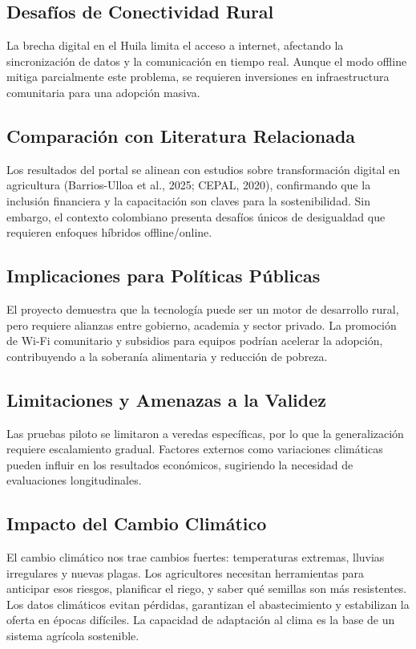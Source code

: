 \subsection{Desafíos de Conectividad Rural}
La brecha digital en el Huila limita el acceso a internet, afectando la sincronización de datos y la comunicación en tiempo real. Aunque el modo offline mitiga parcialmente este problema, se requieren inversiones en infraestructura comunitaria para una adopción masiva.

\subsection{Comparación con Literatura Relacionada}
Los resultados del portal se alinean con estudios sobre transformación digital en agricultura (Barrios-Ulloa et al., 2025; CEPAL, 2020), confirmando que la inclusión financiera y la capacitación son claves para la sostenibilidad. Sin embargo, el contexto colombiano presenta desafíos únicos de desigualdad que requieren enfoques híbridos offline/online.

\subsection{Implicaciones para Políticas Públicas}
El proyecto demuestra que la tecnología puede ser un motor de desarrollo rural, pero requiere alianzas entre gobierno, academia y sector privado. La promoción de Wi-Fi comunitario y subsidios para equipos podrían acelerar la adopción, contribuyendo a la soberanía alimentaria y reducción de pobreza.

\subsection{Limitaciones y Amenazas a la Validez}
Las pruebas piloto se limitaron a veredas específicas, por lo que la generalización requiere escalamiento gradual. Factores externos como variaciones climáticas pueden influir en los resultados económicos, sugiriendo la necesidad de evaluaciones longitudinales.

\subsection{Impacto del Cambio Climático}
El cambio climático nos trae cambios fuertes: temperaturas extremas, lluvias irregulares y nuevas plagas. Los agricultores necesitan herramientas para anticipar esos riesgos, planificar el riego, y saber qué semillas son más resistentes. Los datos climáticos evitan pérdidas, garantizan el abastecimiento y estabilizan la oferta en épocas difíciles. La capacidad de adaptación al clima es la base de un sistema agrícola sostenible.

